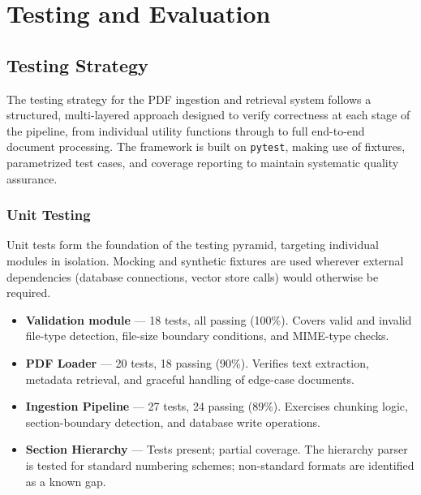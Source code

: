 \documentclass[12pt,a4paper]{report}
\begin{document}
\chapter{Testing and Evaluation}
\label{ch:testing}

\section{Testing Strategy}

The testing strategy for the PDF ingestion and retrieval system follows a
structured, multi-layered approach designed to verify correctness at each stage
of the pipeline, from individual utility functions through to full end-to-end
document processing. The framework is built on \texttt{pytest}, making use of
fixtures, parametrized test cases, and coverage reporting to maintain systematic
quality assurance.

\subsection{Unit Testing}

Unit tests form the foundation of the testing pyramid, targeting individual
modules in isolation. Mocking and synthetic fixtures are used wherever external
dependencies (database connections, vector store calls) would otherwise be
required.

\begin{itemize}
    \item \textbf{Validation module} --- 18 tests, all passing (100\%). Covers
          valid and invalid file-type detection, file-size boundary conditions,
          and MIME-type checks.
    \item \textbf{PDF Loader} --- 20 tests, 18 passing (90\%). Verifies text
          extraction, metadata retrieval, and graceful handling of edge-case
          documents.
    \item \textbf{Ingestion Pipeline} --- 27 tests, 24 passing (89\%). Exercises
          chunking logic, section-boundary detection, and database write
          operations.
    \item \textbf{Section Hierarchy} --- Tests present; partial coverage. The
          hierarchy parser is tested for standard numbering schemes;
          non-standard formats are identified as a known gap.
\end{itemize}
\end{document}
